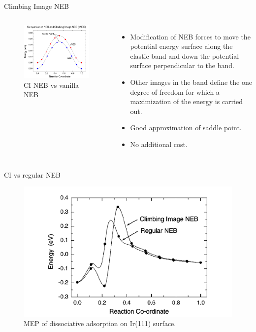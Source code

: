 \documentclass[aspectratio=169]{beamer}
\begin{document}
\begin{frame}{Climbing Image NEB}
\begin{columns}

\begin{figure}
    \centering
    \includegraphics[width=\linewidth]{lectures/figures/12-CINEB.png}
    \caption{CI NEB vs vanilla NEB}
\end{figure} 

\begin{itemize}
    \item Modification of NEB forces to move the potential energy surface along the elastic band and down the potential surface perpendicular to the band.\cite{henkelmanClimbingImageNudged2000} 
    \item Other images in the band define the one degree of freedom for which a maximization of the energy is carried out.
    \item Good approximation of saddle point. 
    \item No additional cost.
\end{itemize}
\end{columns} 
\end{frame} 

\begin{frame}{CI vs regular NEB}
\begin{figure}
    \centering
    \includegraphics[width=0.6\linewidth]{lectures/figures/12-CINEB_2.png}
    \caption{MEP of  dissociative adsorption on Ir(111) surface.\cite{henkelmanClimbingImageNudged2000}}
\end{figure} 
\end{frame} 
\end{document}
